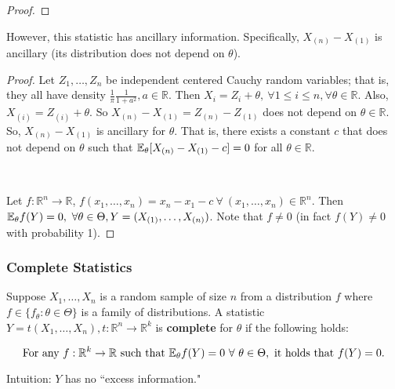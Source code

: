 \begin{example}
\begin{proof}
\end{proof}

However, this statistic has ancillary information. Specifically, \(X_{(n)} - X_{(1)}\) is ancillary (its distribution does not depend on \(\theta\)).

\begin{proof} Let \(Z_1, \ldots, Z_n\) be independent centered Cauchy random variables; that is, they all have density \(\frac{1}{\pi} \frac{1}{1+a^2}, a \in \mathbb{R}\). Then \(X_i = Z_i + \theta, \ \forall 1 \leq i \leq n, \forall \theta \in \mathbb{R}\). Also, \(X_{(i)} = Z_{(i)} + \theta\). So \(X_{(n)} - X_{(1)} = Z_{(n)} - Z_{(1)}\) does not depend on \(\theta \in \mathbb{R}\). So, \(X_{(n)} - X_{(1)}\) is ancillary for \(\theta\). That is, there exists a constant \(c\) that does not depend on \(\theta\) such that \(\E_\theta[X_{(n)} - X_{(1)} - c] = 0\) for all \(\theta \in \mathbb{R}\). 

\

Let \(f: \mathbb{R}^n \to \mathbb{R}\), \(f(x_1, \ldots, x_n) = x_n - x_1 - c \ \forall \ (x_1, \ldots, x_n) \in \mathbb{R}^n\). Then \(\E_\theta f(Y) = 0, \ \forall \theta \in \Theta, Y  = (X_{(1)}, \ldots, X_{(n)})\). Note that \(f \neq 0\) (in fact \(f(Y) \neq 0\) with probability 1).

\end{proof}

\end{example}

\subsubsection{Complete Statistics}

\begin{definition}Suppose \(X_1, \ldots, X_n\) is a random sample of size \(n\) from a distribution \(f\) where \(f \in \{f_\theta: \theta \in \Theta\}\) is a family of distributions. A statistic \(Y = t(X_1, \ldots, X_n), t: \mathbb{R}^n \to \mathbb{R}^k\) is \textbf{complete} for \(\theta\) if the following holds:

\[
\text{For any } f: \mathbb{R}^k \to \mathbb{R} \text{ such that } \E_\theta f(Y) = 0 \ \forall \ \theta \in \Theta, \text{ it holds that } f(Y) = 0.
\]

Intuition: \(Y\) has no ``excess information."

\end{definition}

